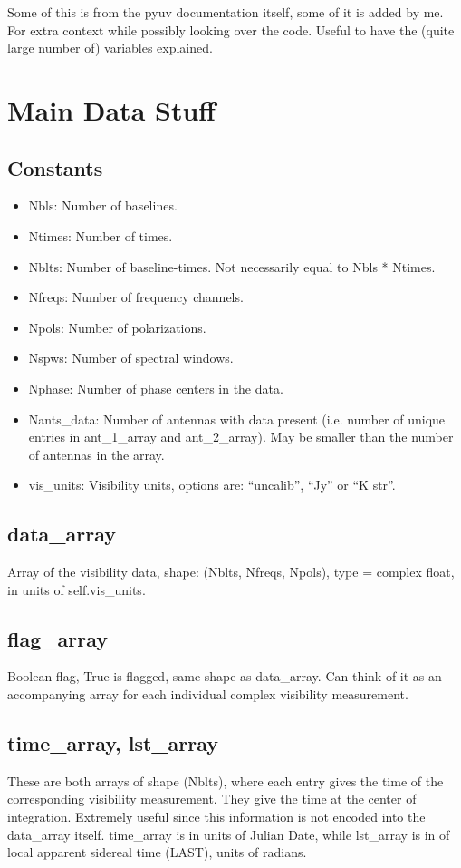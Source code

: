 \documentclass[12pt]{article}
\begin{document}
Some of this is from the pyuv documentation itself, some of it is added by me. 
For extra context while possibly looking over the code.
Useful to have the (quite large number of) variables explained.

\section{Main Data Stuff}


\subsection{Constants}
\begin{itemize}
  \item Nbls: Number of baselines.
  \item Ntimes: Number of times.
  \item Nblts: Number of baseline-times. Not necessarily equal to Nbls * Ntimes.
  \item Nfreqs: Number of frequency channels.
  \item Npols: Number of polarizations.
  \item Nspws: Number of spectral windows.
  \item Nphase: Number of phase centers in the data.
  \item Nants\_data: Number of antennas with data present (i.e. number of unique entries in ant\_1\_array and ant\_2\_array). May be smaller than the number of antennas in the array. 
  \item vis\_units: Visibility units, options are: “uncalib”, “Jy” or “K str”.
\end{itemize}


\subsection{data\_array}
Array of the visibility data, shape: (Nblts, Nfreqs, Npols), type = complex float, in units of self.vis\_units.


\subsection{flag\_array}
Boolean flag, True is flagged, same shape as data\_array.
Can think of it as an accompanying array for each individual complex visibility measurement.


\subsection{time\_array, lst\_array}
These are both arrays of shape (Nblts), where each entry gives the time of the corresponding visibility measurement.
They give the time at the center of integration.
Extremely useful since this information is not encoded into the data\_array itself.
time\_array is in units of Julian Date, while lst\_array is in of local apparent sidereal time (LAST), units of radians.
\end{document}
